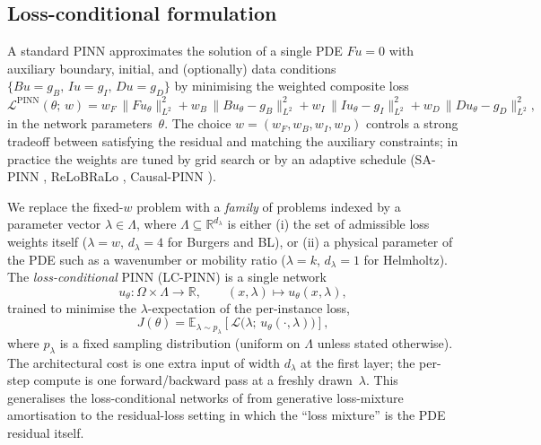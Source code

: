 \documentclass{article}
\theoremstyle{plain}
\theoremstyle{definition}
\theoremstyle{remark}
\begin{document}
\subsection{Loss-conditional formulation}

A standard PINN \citep{raissi2019} approximates the solution of a
single PDE $F u = 0$ with auxiliary boundary, initial, and (optionally)
data conditions $\{B u = g_B,\, I u = g_I,\, D u = g_D\}$ by minimising
the weighted composite loss
\begin{equation}
   \mathcal{L}^{\mathrm{PINN}}(\theta;\, w) =
     w_F \,\| F u_\theta \|_{L^2}^2 +
     w_B \,\| B u_\theta - g_B \|_{L^2}^2 +
     w_I \,\| I u_\theta - g_I \|_{L^2}^2 +
     w_D \,\| D u_\theta - g_D \|_{L^2}^2 ,
\label{eq:standard-pinn}
\end{equation}
in the network parameters~$\theta$. The choice
$w = (w_F, w_B, w_I, w_D)$ controls a strong tradeoff between
satisfying the residual and matching the auxiliary constraints; in
practice the weights are tuned by grid search or by an adaptive
schedule (SA-PINN \citep{mcclenny2020}, ReLoBRaLo \citep{bischof2021},
Causal-PINN \citep{wang2024}).

We replace the fixed-$w$ problem with a \emph{family} of problems
indexed by a parameter vector $\lambda \in \Lambda$, where
$\Lambda \subseteq \mathbb{R}^{d_\lambda}$ is either (i) the set of
admissible loss weights itself
($\lambda = w$, $d_\lambda = 4$ for Burgers and BL), or (ii) a
physical parameter of the PDE such as a wavenumber or mobility ratio
($\lambda = k$, $d_\lambda = 1$ for Helmholtz). The
\emph{loss-conditional} PINN (LC-PINN) is a single network
\begin{equation}
   u_\theta : \Omega \times \Lambda \to \mathbb{R},
\qquad
   (x, \lambda) \mapsto u_\theta(x, \lambda),
\label{eq:lc-network}
\end{equation}
trained to minimise the $\lambda$-expectation of the per-instance loss,
\begin{equation}
   J(\theta) = \mathbb{E}_{\lambda \sim p_\lambda}\!\left[
       \mathcal{L}\bigl(\lambda;\, u_\theta(\cdot, \lambda)\bigr)
   \right] ,
\label{eq:lc-objective}
\end{equation}
where $p_\lambda$ is a fixed sampling distribution (uniform on
$\Lambda$ unless stated otherwise). The architectural cost is one
extra input of width $d_\lambda$ at the first layer; the per-step
compute is one forward/backward pass at a freshly drawn~$\lambda$.
This generalises the loss-conditional networks of
\citet{dosovitskiy2020} from generative loss-mixture amortisation
to the residual-loss setting in which the ``loss mixture'' is the
PDE residual itself.
\end{document}
